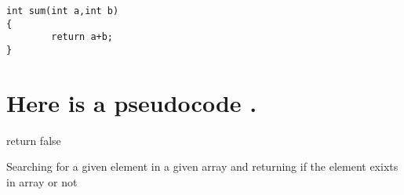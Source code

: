 \documentclass{article}
\begin{document}
\begin{lstlisting}
int sum(int a,int b)
{
        return a+b;
}
\end{lstlisting}


\section*{Here is a pseudocode .}


\begin{algorithm}[H]
return false\;
\caption{Searching for a given element in a given array and returning if the element exixts in array or not}
\end{algorithm}
\end{document}
